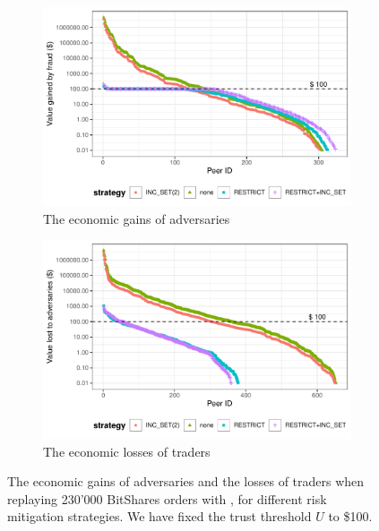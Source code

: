 \begin{figure}
	\centering
	\begin{subfigure}{.9\textwidth}
		\centering
		\captionsetup{width=.9\linewidth}
		\includegraphics[width=.95\linewidth]{xchange/assets/experiments/fraud/gained_per_user}
		\caption{The economic gains of adversaries}
		\label{fig:fraud_experiment_gained}
	\end{subfigure}\vspace{0.3cm}
	\begin{subfigure}{.9\textwidth}
		\centering
		\captionsetup{width=.9\linewidth}
		\includegraphics[width=.95\linewidth]{xchange/assets/experiments/fraud/losses_per_user}
		\caption{The economic losses of traders}
		\label{fig:fraud_experiment_losses}
	\end{subfigure}%
	\caption{The economic gains of adversaries and the losses of traders when replaying 230'000 BitShares orders with \ModelName{}, for different risk mitigation strategies. We have fixed the trust threshold $ U $ to \$100.}
	\label{fig:fraud_experiments}
\end{figure}


